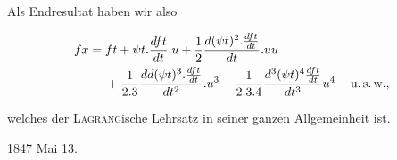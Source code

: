 %

Als Endresultat haben wir also

\[\begin{aligned}
fx={}&ft+\psi t\mathord{.}\frac{dft}{dt}\mathord{.}u
+\frac{1}{2}\frac{d(\psi t)^2\mathord{.}\frac{dft}{dt}}{dt}\mathord{.}uu\\
&+\frac{1}{2.3}\frac{dd(\psi t)^3\mathord{.}\frac{dft}{dt}}{dt^2}\mathord{.}u^3
+\frac{1}{2.3.4}\frac{d^3(\psi t)^4\frac{dft}{dt}}{dt^3}u^4+\text{u.\,s.\,w.},
\end{aligned}\]

\noindent welches der \textsc{Lagrang}ische Lehrsatz in seiner ganzen Allgemeinheit ist.

1847 Mai 13.
